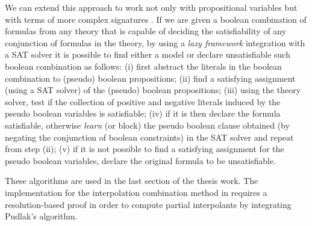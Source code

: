 We can extend this approach to work not only with propositional
variables but with terms of more complex signatures 
\cite{10.5555/1391237}. If we are given a boolean combination 
of formulas from any theory that is capable of deciding the 
satisfiability of any conjunction of formulas in the theory, 
by using a \emph{lazy framework} integration with a SAT solver it is 
possible to find either a model or declare unsatisfiable such boolean
combination as follows: (i) first abstract the literals in the boolean
combination to (pseudo) boolean propositions; (ii) find a satisfying
assignment (using a SAT solver) of the (pseudo) boolean propositions;
(iii) using the theory solver, test if the collection of positive
and negative literals induced by the pseudo boolean variables is
satisfiable; (iv) if it is then declare the formula satisfiable, 
otherwise \emph{learn} (or block) the pseudo boolean clause obtained
(by negating the conjunction of boolean constraints) in the SAT
solver and repeat from step (ii); (v) if it is not possible to
find a satisfying assignment for the pseudo boolean variables, 
declare the original formula to be unsatisfiable.

These algorithms are used in the last section of the thesis work.
The implementation for the interpolation combination method
in \cite{10.1007/11532231_26} requires a resolution-based
proof in order to compute partial interpolants by integrating
Pudlak's algorithm.

